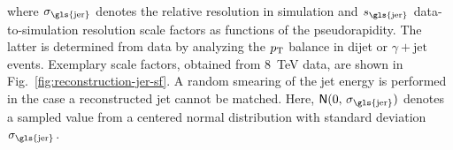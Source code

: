 where $\sigma_\mathrm{\gls{jer}}$ denotes the relative resolution in simulation and  $s_\mathrm{\gls{jer}}$ data-to-simulation resolution scale factors as functions of the pseudorapidity. The latter is determined from data by analyzing the $p_\mathrm{T}$ balance in dijet or $\gamma+\mathrm{jet}$ events. Exemplary scale factors, obtained from 8~TeV data, are shown in Fig.~\ref{fig:reconstruction-jer-sf}. A random smearing of the jet energy is performed in the case a reconstructed jet cannot be matched. Here, $\mathsf{N}(0,\,\sigma_\mathrm{\gls{jer}})$ denotes a sampled value from a centered normal distribution with standard deviation $\sigma_\mathrm{\gls{jer}}$.




